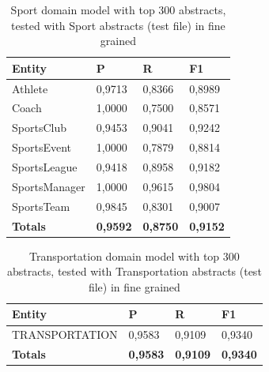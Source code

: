 \documentclass[thesis=M,english]{FITthesis}[2018/05/30]
\begin{document}
	\begin{table}[H]\centering
		\caption{Sport domain model with top 300 abstracts, tested with Sport abstracts (test file) in fine grained}
		\label{}
		\begin{tabular}{|l|l|l|l|}
			\hline {\textbf{Entity}} & {\textbf{P}} & {\textbf{R}} & {\textbf{F1}}\\\hline
				Athlete & 0,9713 & 0,8366 & 0,8989\\
				Coach & 1,0000 & 0,7500 & 0,8571\\
				SportsClub & 0,9453 & 0,9041 & 0,9242\\
				SportsEvent & 1,0000 & 0,7879 & 0,8814\\
				SportsLeague & 0,9418 & 0,8958 & 0,9182\\
				SportsManager & 1,0000 & 0,9615 & 0,9804\\				
				SportsTeam & 0,9845 & 0,8301 & 0,9007\\\hline
				\textbf{Totals} & \textbf{0,9592} & \textbf{0,8750} & \textbf{0,9152}\\\hline
		\end{tabular}
	\end{table}	

	\begin{table}[H]\centering
		\caption{Transportation domain model with top 300 abstracts, tested with Transportation abstracts (test file) in fine grained}
		\label{}
		\begin{tabular}{|l|l|l|l|}
			\hline {\textbf{Entity}} & {\textbf{P}} & {\textbf{R}} & {\textbf{F1}}\\\hline
				TRANSPORTATION & 0,9583 & 0,9109 & 0,9340\\\hline
				\textbf{Totals} & \textbf{0,9583} & \textbf{0,9109} & \textbf{0,9340}\\\hline
		\end{tabular}
	\end{table}
	
\end{document}

